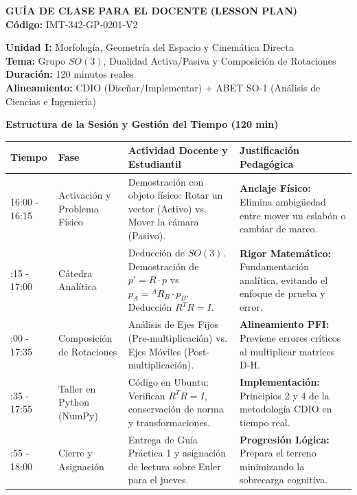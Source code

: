 \documentclass[11pt, a4paper]{article}
\begin{document}
\begin{center}
    \Large\textbf{\textcolor{ucbblue}{GUÍA DE CLASE PARA EL DOCENTE (LESSON PLAN)}}\\
    \vspace{0.2cm}
    \normalsize\textbf{Código:} IMT-342-GP-0201-V2
\end{center}
\vspace{0.3cm}

\noindent\textbf{Unidad I:} Morfología, Geometría del Espacio y Cinemática Directa \\
\textbf{Tema:} Grupo $SO(3)$, Dualidad Activa/Pasiva y Composición de Rotaciones \\
\textbf{Duración:} 120 minutos reales \\
\textbf{Alineamiento:} CDIO (Diseñar/Implementar) + ABET SO-1 (Análisis de Ciencias e Ingeniería)

\vspace{0.5cm}
\noindent\textbf{\large Estructura de la Sesión y Gestión del Tiempo (120 min)}
\vspace{0.2cm}

\noindent
\begin{tabularx}{\textwidth}{@{} l >{\raggedright\arraybackslash}p{3cm} X X @{}}
\toprule
\textbf{Tiempo} & \textbf{Fase} & \textbf{Actividad Docente y Estudiantil} & \textbf{Justificación Pedagógica} \\ \midrule
16:00 - 16:15 & Activación y \newline Problema Físico & Demostración con objeto físico: Rotar un vector (Activo) vs. Mover la cámara (Pasivo). & \textbf{Anclaje Físico:} Elimina ambigüedad entre mover un eslabón o cambiar de marco. \\ \addlinespace
16:15 - 17:00 & Cátedra \newline Analítica & Deducción de $SO(3)$. Demostración de $p' = R \cdot p$ vs $p_A = {}^{A}R_B \cdot p_B$. Deducción $R^T R = I$. & \textbf{Rigor Matemático:} Fundamentación analítica, evitando el enfoque de prueba y error. \\ \addlinespace
17:00 - 17:35 & Composición de \newline Rotaciones & Análisis de Ejes Fijos (Pre-multiplicación) vs. Ejes Móviles (Post-multiplicación). & \textbf{Alineamiento PFI:} Previene errores críticos al multiplicar matrices D-H. \\ \addlinespace
17:35 - 17:55 & Taller en Python \newline (NumPy) & Código en Ubuntu: Verifican $R^T R = I$, conservación de norma y transformaciones. & \textbf{Implementación:} Principios 2 y 4 de la metodología CDIO en tiempo real. \\ \addlinespace
17:55 - 18:00 & Cierre y \newline Asignación & Entrega de Guía Práctica 1 y asignación de lectura sobre Euler para el jueves. & \textbf{Progresión Lógica:} Prepara el terreno minimizando la sobrecarga cognitiva. \\ \bottomrule
\end{tabularx}
\end{document}

